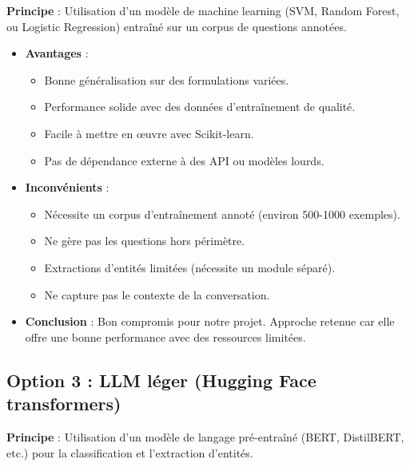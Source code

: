 \textbf{Principe} : Utilisation d'un modèle de machine learning (SVM, Random Forest, ou Logistic Regression) entraîné sur un corpus de questions annotées.

\begin{itemize}
    \item \textbf{Avantages} :
        \begin{itemize}
            \item Bonne généralisation sur des formulations variées.
            \item Performance solide avec des données d'entraînement de qualité.
            \item Facile à mettre en œuvre avec Scikit-learn.
            \item Pas de dépendance externe à des API ou modèles lourds.
        \end{itemize}
    \item \textbf{Inconvénients} :
        \begin{itemize}
            \item Nécessite un corpus d'entraînement annoté (environ 500-1000 exemples).
            \item Ne gère pas les questions hors périmètre.
            \item Extractions d'entités limitées (nécessite un module séparé).
            \item Ne capture pas le contexte de la conversation.
        \end{itemize}
    \item \textbf{Conclusion} : Bon compromis pour notre projet. Approche retenue car elle offre une bonne performance avec des ressources limitées.
\end{itemize}

\subsection{Option 3 : LLM léger (Hugging Face transformers)}
\label{subsec:nlp-llm}

\textbf{Principe} : Utilisation d'un modèle de langage pré-entraîné (BERT, DistilBERT, etc.) pour la classification et l'extraction d'entités.

